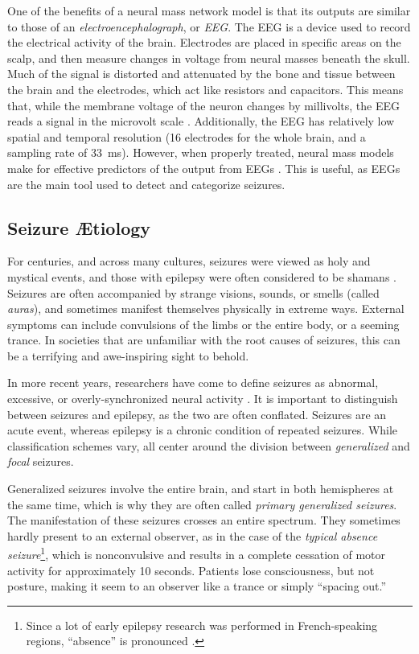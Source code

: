 One of the benefits of a neural mass network model is that its outputs are similar to those of an \textit{electroencephalograph}, or \textit{EEG}.
The EEG is a device used to record the electrical activity of the brain.
Electrodes are placed in specific areas on the scalp, and then measure changes in voltage from neural masses beneath the skull.
Much of the signal is distorted and attenuated by the bone and tissue between the brain and the electrodes, which act like resistors and capacitors.
This means that, while the membrane voltage of the neuron changes by millivolts, the EEG reads a signal in the microvolt scale \cite{Kandel2013}.
Additionally, the EEG has relatively low spatial and temporal resolution (16 electrodes for the whole brain, and a sampling rate of \SI{33}{\ms}).
However, when properly treated, neural mass models make for effective predictors of the output from EEGs \cite{Taylor2012,Leistritz2007}.
This is useful, as EEGs are the main tool used to detect and categorize seizures.

\subsection{Seizure \AE tiology}
\label{sec:intro_seizures_aetiology}
For centuries, and across many cultures, seizures were viewed as holy and mystical events, and those with epilepsy were often considered to be shamans \cite{Kandel2013,Fadiman1998}.
Seizures are often accompanied by strange visions, sounds, or smells (called \textit{auras}), and sometimes manifest themselves physically in extreme ways.
External symptoms can include convulsions of the limbs or the entire body, or a seeming trance.
In societies that are unfamiliar with the root causes of seizures, this can be a terrifying and awe-inspiring sight to behold.

In more recent years, researchers have come to define seizures as abnormal, excessive, or overly-synchronized neural activity \cite{Kandel2013,Baier2012}.
It is important to distinguish between seizures and epilepsy, as the two are often conflated.
Seizures are an acute event, whereas epilepsy is a chronic condition of repeated seizures.
While classification schemes vary, all center around the division between \textit{generalized} and \textit{focal} seizures.

Generalized seizures involve the entire brain, and start in both hemispheres at the same time, which is why they are often called \textit{primary generalized seizures}.
The manifestation of these seizures crosses an entire spectrum.
They sometimes hardly present to an external observer, as in the case of the \textit{typical absence seizure}\footnote{Since a lot of early epilepsy research was performed in French-speaking regions, ``absence'' is pronounced .}, which is nonconvulsive and results in a complete cessation of motor activity for approximately 10 seconds.
Patients lose consciousness, but not posture, making it seem to an observer like a trance or simply ``spacing out.''

